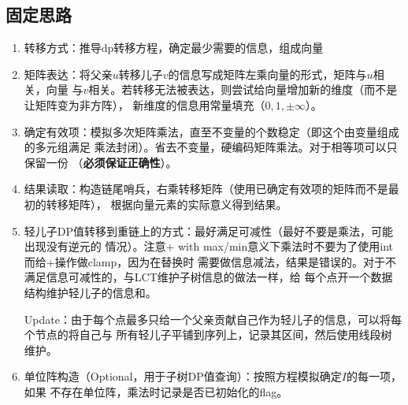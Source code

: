 \subsection{固定思路}
\begin{enumerate}
    \item 转移方式：推导dp转移方程，确定最少需要的信息，组成向量
    \item 矩阵表达：将父亲$u$转移儿子$v$的信息写成矩阵左乘向量的形式，矩阵与$u$相关，向量
    与$v$相关。若转移无法被表达，则尝试给向量增加新的维度（而不是让矩阵变为非方阵），
    新维度的信息用常量填充（$0,1,\pm \infty$）。
    \item 确定有效项：模拟多次矩阵乘法，直至不变量的个数稳定（即这个由变量组成的多元组满足
    乘法封闭）。省去不变量，硬编码矩阵乘法。对于相等项可以只保留一份
    （{\bfseries 必须保证正确性}）。
    \item 结果读取：构造链尾哨兵，右乘转移矩阵（使用已确定有效项的矩阵而不是最初的转移矩阵），
    根据向量元素的实际意义得到结果。
    \item 轻儿子DP值转移到重链上的方式：最好满足可减性（最好不要是乘法，可能出现没有逆元的
    情况）。注意+ with max/min意义下乘法时不要为了使用int而给+操作做clamp，因为在替换时
    需要做信息减法，结果是错误的。对于不满足信息可减性的，与LCT维护子树信息的做法一样，给
    每个点开一个数据结构维护轻儿子的信息和。

    Update：由于每个点最多只给一个父亲贡献自己作为轻儿子的信息，可以将每个节点的将自己与
    所有轻儿子平铺到序列上，记录其区间，然后使用线段树维护。
    \item 单位阵构造（Optional，用于子树DP值查询）：按照方程模拟确定$I$的每一项，如果
    不存在单位阵，乘法时记录是否已初始化的flag。
\end{enumerate}
